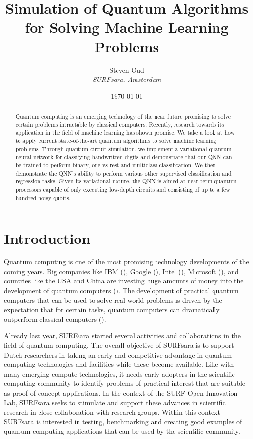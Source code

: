 \documentclass[a4paper,10pt]{article}
\title{Simulation of Quantum Algorithms for Solving Machine Learning Problems}
\author{Steven Oud \\ \emph{SURFsara, Amsterdam}}
\date{\today}
\begin{document}
\maketitle

\begin{abstract}
Quantum computing is an emerging technology of the near future promising to solve certain problems intractable by classical computers.
Recently, research towards its application in the field of machine learning has shown promise.
We take a look at how to apply current state-of-the-art quantum algorithms to solve machine learning problems.
Through quantum circuit simulation, we implement a variational quantum neural network for classifying handwritten digits and demonstrate that our QNN can be trained to perform binary, one-vs-rest and multiclass classification.
We then demonstrate the QNN's ability to perform various other supervised classification and regression tasks.
Given its variational nature, the QNN is aimed at near-term quantum processors capable of only executing low-depth circuits and consisting of up to a few hundred noisy qubits.
\end{abstract}

\clearpage

\tableofcontents

\clearpage

\section{Introduction}
Quantum computing is one of the most promising technology developments of the coming years.
Big companies like IBM (\cite{ibm-quantum}), Google (\cite{google-quantum}), Intel (\cite{intel-quantum}), Microsoft (\cite{microsoft-quantum}), and countries like the USA and China are investing huge amounts of money into the development of quantum computers (\cite{usa-quantum, china-quantum}).
The development of practical quantum computers that can be used to solve real-world problems is driven by the expectation that for certain tasks, quantum computers can dramatically outperform classical computers (\cite{preskill-qc}).

Already last year, SURFsara started several activities and collaborations in the field of quantum computing.
The overall objective of SURFsara is to support Dutch researchers in taking an early and competitive advantage in quantum computing technologies and facilities while these become available.
Like with many emerging compute technologies, it needs early adopters in the scientific computing community to identify problems of practical interest that are suitable as proof-of-concept applications.
In the context of the SURF Open Innovation Lab, SURFsara seeks to stimulate and support these advances in scientific research in close collaboration with research groups.
Within this context SURFsara is interested in testing, benchmarking and creating good examples of quantum computing applications that can be used by the scientific community.
\end{document}
